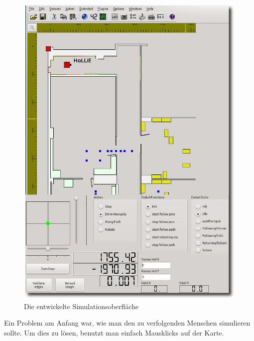 \begin{figure}[h]
\centering
\includegraphics[scale=0.4]{graphics/mcagui_screenshot.png}		
\caption{\label{fig:mcagui} Die entwickelte Simulationsoberfläche
}
\end{figure}

Ein Problem am Anfang war, wie man den zu verfolgenden Menschen simulieren sollte.
Um dies zu lösen, benutzt man einfach Mausklicks auf der Karte.
